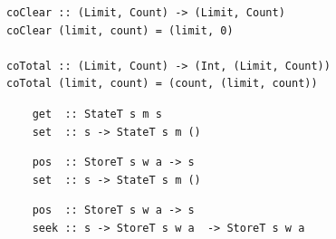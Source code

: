 \documentclass{beamer}
\begin{document}
\begin{frame}[fragile]
  \begin{verbatim}
coClear :: (Limit, Count) -> (Limit, Count)
coClear (limit, count) = (limit, 0)

coTotal :: (Limit, Count) -> (Int, (Limit, Count))
coTotal (limit, count) = (count, (limit, count))
  \end{verbatim}
\end{frame}

\begin{frame}[fragile]
  \begin{overprint}
  \begin{verbatim}
    get  :: StateT s m s
    set  :: s -> StateT s m ()
  \end{verbatim}
  \begin{verbatim}
    pos  :: StoreT s w a -> s
    set  :: s -> StateT s m ()
  \end{verbatim}
  \begin{verbatim}
    pos  :: StoreT s w a -> s
    seek :: s -> StoreT s w a  -> StoreT s w a
  \end{verbatim}
  \end{overprint}
\end{frame}
\end{document}
